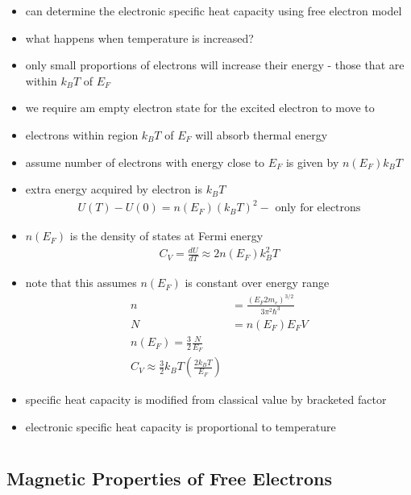 \documentclass[a4paper,11pt,normalem]{article}
\begin{document}
\begin{itemize}
    \item can determine the electronic specific heat capacity using free electron model
    \item what happens when temperature is increased?
    \item only small proportions of electrons will increase their energy - those that are within \(k_BT\) of \(E_F\)
    \item we require am empty electron state for the excited electron to move to
    \item electrons within region \(k_BT\) of \(E_F\) will absorb thermal energy
    \item assume number of electrons with energy close to \(E_F\) is given by \(n(E_F)k_BT\)
    \item extra energy acquired by electron is \(k_BT\)
        \begin{align*}
            U(T) - U(0) = n(E_F)(k_BT)^2 - \text{ only for electrons}
        \end{align*}
    \item \(n(E_F)\) is the density of states at Fermi energy
        \begin{align*}
            C_V = \frac{dU}{dT} \approx 2n(E_F)k_B^2T
        \end{align*}
    \item note that this assumes \(n(E_F)\) is constant over energy range
        \begin{align*}
            n &= \frac{(E_F2m_e)^{3/2}}{3\pi^2\hbar^3} \\
            N &= n(E_F)E_FV \\
            n(E_F) = \frac{3}{2}\frac{N}{E_F} \\
            C_V \approx \frac{3}{2}k_BT\left(\frac{2k_BT}{E_F}\right)
        \end{align*}
    \item specific heat capacity is modified from classical value by bracketed factor
    \item electronic specific heat capacity is proportional to temperature
\end{itemize}

\section{}

\subsection{Magnetic Properties of Free Electrons}
\end{document}

